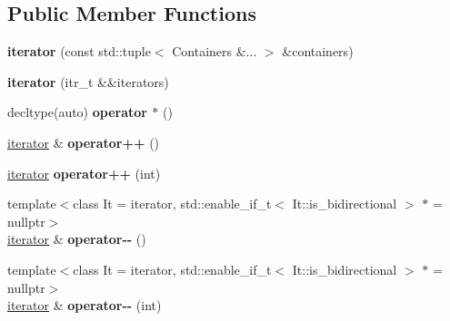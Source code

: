 \subsection*{Public Member Functions}
\begin{DoxyCompactItemize}
\item 
\mbox{\label{classouchi_1_1multiitr_1_1iterator_ac0cc81a8587fc979718df61cf5afdda6}} 
{\bfseries iterator} (const std\+::tuple$<$ Containers \&... $>$ \&containers)
\item 
\mbox{\label{classouchi_1_1multiitr_1_1iterator_a04dc32a7cd136e51a87ad44c057afb61}} 
{\bfseries iterator} (itr\+\_\+t \&\&iterators)
\item 
\mbox{\label{classouchi_1_1multiitr_1_1iterator_a79607802463ae1b6565a64d075e281f5}} 
decltype(auto) {\bfseries operator $\ast$} ()
\item 
\mbox{\label{classouchi_1_1multiitr_1_1iterator_a1249687919342e15485f91c6f1a70daa}} 
\mbox{\hyperlink{classouchi_1_1multiitr_1_1iterator}{iterator}} \& {\bfseries operator++} ()
\item 
\mbox{\label{classouchi_1_1multiitr_1_1iterator_a14cbe43c5467d1eff4b08d1c1a1533f0}} 
\mbox{\hyperlink{classouchi_1_1multiitr_1_1iterator}{iterator}} {\bfseries operator++} (int)
\item 
\mbox{\label{classouchi_1_1multiitr_1_1iterator_a24578f64ef535c276d1ca66866898609}} 
{\footnotesize template$<$class It  = iterator, std\+::enable\+\_\+if\+\_\+t$<$ It\+::is\+\_\+bidirectional $>$ $\ast$  = nullptr$>$ }\\\mbox{\hyperlink{classouchi_1_1multiitr_1_1iterator}{iterator}} \& {\bfseries operator-\/-\/} ()
\item 
\mbox{\label{classouchi_1_1multiitr_1_1iterator_adb4f6b9a120fde6a868eb5ba6ede574b}} 
{\footnotesize template$<$class It  = iterator, std\+::enable\+\_\+if\+\_\+t$<$ It\+::is\+\_\+bidirectional $>$ $\ast$  = nullptr$>$ }\\\mbox{\hyperlink{classouchi_1_1multiitr_1_1iterator}{iterator}} \& {\bfseries operator-\/-\/} (int)
\end{DoxyCompactItemize}
